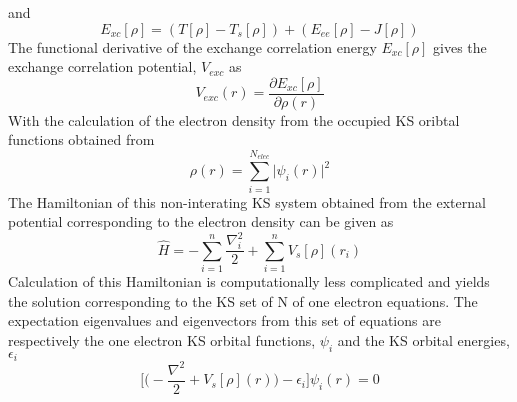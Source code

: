 \documentclass[a4paper,11pt]{report}
\begin{document}
and
\begin{equation}\label{exc}
E_{xc}[\rho] = (T[\rho]-T_{s}[\rho]) + (E_{ee}[\rho]-J[\rho])
\end{equation}
The functional derivative of the exchange correlation energy $E_{xc}[\rho]$ gives the exchange correlation potential, $V_{exc}$ as
\begin{equation}\label{vxc}
V_{exc}(r) = \frac{\partial E_{xc}[\rho]}{\partial\rho(r)}
\end{equation}
With the calculation of the electron density from the occupied KS oribtal functions obtained from
\begin{equation}\label{obf}
\rho(r) = \sum_{i=1}^{N_{elec}}\bigg|\psi_{i}(r)\bigg|^{2}
\end{equation}
The Hamiltonian of this non-interating KS system obtained from the external potential corresponding to the electron density can be given as
\begin{equation}\label{ha1}
\hat{H} = -\sum_{i=1}^{n}\frac{\nabla_{i}^{2}}{2} + \sum_{i=1}^{n}V_{s}[\rho](r_{i})
\end{equation}
Calculation of this Hamiltonian is computationally less complicated and yields the solution corresponding to the KS set of N of one electron
equations. The expectation eigenvalues and eigenvectors from this set of equations are respectively the one electron KS orbital functions, 
$\psi_{i}$ and the KS orbital energies, $\epsilon_{i}$
\begin{equation}\label{ks111}
\bigg[\bigg(-\frac{\nabla^{2}}{2} + V_{s}[\rho](r)\bigg) - \epsilon_{i}\bigg]\psi_{i}(r) = 0 
\end{equation}
\end{document}
